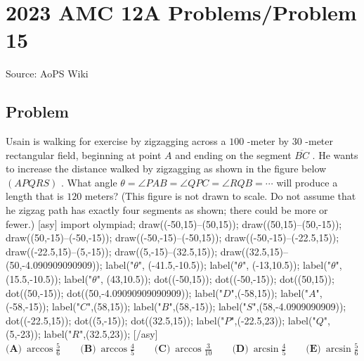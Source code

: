 \documentclass[12pt]{article}
\begin{document}
\section*{{2023 AMC 12A Problems/Problem 15}}
Source: AoPS Wiki

\subsection*{Problem}
Usain is walking for exercise by zigzagging across a $100$ -meter by $30$ -meter rectangular field, beginning at point $A$ and ending on the segment $\overline{BC}$ . He wants to increase the distance walked by zigzagging as shown in the figure below $(APQRS)$ . What angle $\theta = \angle PAB=\angle QPC=\angle RQB=\cdots$ will produce a length that is $120$ meters? (This figure is not drawn to scale. Do not assume that he zigzag path has exactly four segments as shown; there could be more or fewer.) [asy] import olympiad; draw((-50,15)--(50,15)); draw((50,15)--(50,-15)); draw((50,-15)--(-50,-15)); draw((-50,-15)--(-50,15)); draw((-50,-15)--(-22.5,15)); draw((-22.5,15)--(5,-15)); draw((5,-15)--(32.5,15)); draw((32.5,15)--(50,-4.090909090909)); label("$\theta$", (-41.5,-10.5)); label("$\theta$", (-13,10.5)); label("$\theta$", (15.5,-10.5)); label("$\theta$", (43,10.5)); dot((-50,15)); dot((-50,-15)); dot((50,15)); dot((50,-15)); dot((50,-4.09090909090909)); label("$D$",(-58,15)); label("$A$",(-58,-15)); label("$C$",(58,15)); label("$B$",(58,-15)); label("$S$",(58,-4.0909090909)); dot((-22.5,15)); dot((5,-15)); dot((32.5,15)); label("$P$",(-22.5,23)); label("$Q$",(5,-23)); label("$R$",(32.5,23)); [/asy] $\textbf{(A)}~\arccos\frac{5}{6}\qquad\textbf{(B)}~\arccos\frac{4}{5}\qquad\textbf{(C)}~\arccos\frac{3}{10}\qquad\textbf{(D)}~\arcsin\frac{4}{5}\qquad\textbf{(E)}~\arcsin\frac{5}{6}$
\end{document}
